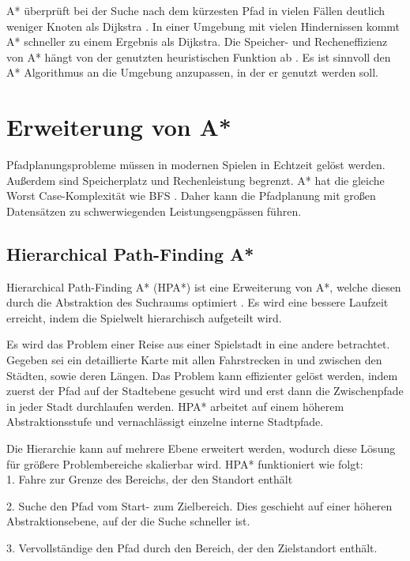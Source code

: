 A* überprüft bei der Suche nach dem kürzesten Pfad in vielen Fällen deutlich weniger Knoten als Dijkstra \cite[S.20f]{Kri09}. In einer Umgebung mit vielen Hindernissen kommt A* schneller zu einem Ergebnis als Dijkstra. Die Speicher- und Recheneffizienz von A* hängt von der genutzten heuristischen Funktion ab \cite[S.237]{Noo15}. Es ist sinnvoll den A* Algorithmus an die Umgebung anzupassen, in der er genutzt werden soll.

\section{Erweiterung von A*}
Pfadplanungsprobleme müssen in modernen Spielen in Echtzeit gelöst werden. Außerdem sind Speicherplatz und Rechenleistung begrenzt. A* hat die gleiche Worst Case-Komplexität wie BFS \cite{You19}. Daher kann die Pfadplanung mit großen Datensätzen zu schwerwiegenden Leistungsengpässen führen.


\subsection{Hierarchical Path-Finding A*}
Hierarchical Path-Finding A* (HPA*) ist eine Erweiterung von A*, welche diesen durch die Abstraktion des Suchraums optimiert \cite{Bot04}. Es wird eine bessere Laufzeit erreicht, indem die Spielwelt hierarchisch aufgeteilt wird.

Es wird das Problem einer Reise aus einer Spielstadt in eine andere betrachtet. Gegeben sei ein detaillierte Karte mit allen Fahrstrecken in und zwischen den Städten, sowie deren Längen. Das Problem kann effizienter gelöst werden, indem zuerst der Pfad auf der Stadtebene gesucht wird und erst dann die Zwischenpfade in jeder Stadt durchlaufen werden. HPA* arbeitet auf einem höherem Abstraktionsstufe und vernachlässigt einzelne interne Stadtpfade. %

 Die Hierarchie kann auf mehrere Ebene erweitert werden, wodurch diese Lösung für größere Problembereiche skalierbar wird. HPA* funktioniert wie folgt:\\

1. Fahre zur Grenze des Bereichs, der den Standort enthält

2. Suche den Pfad vom Start- zum Zielbereich. Dies geschieht auf einer höheren Abstraktionsebene, auf der die Suche schneller ist.

3. Vervollständige den Pfad durch den Bereich, der den Zielstandort enthält.\\

